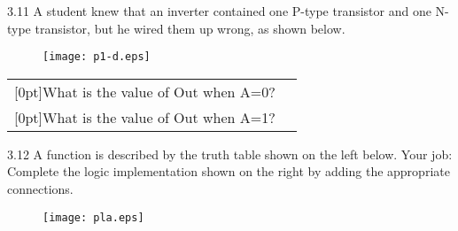 \documentclass{patt}
\begin{document}
\begin{exercises}
  \begin{figure}[H]
  \end{figure}

\item[3.11] A student knew that an inverter contained one P-type transistor
and one N-type transistor, but he wired them up wrong, as shown below. 

\begin{figure}[h]
\centering
\texttt{[image: p1-d.eps]}
\end{figure}

\begin{center}
\begin{tabular}{ll}
     
     \raisebox{1.8ex}[0pt]{What is the value of Out when A=0?} &
\setlength{\unitlength}{1in}

 \\
     \raisebox{1.8ex}[0pt]{What is the value of Out when A=1?} & 
\setlength{\unitlength}{1in}

\\
\end{tabular}

\end{center}

\pagebreak

\item[3.12] A function is described by the truth table shown on the
left below.  Your job: Complete the logic implementation shown on the right
by adding the appropriate connections. 


%

\hspace{2.0in}
\begin{figure}[h]
\centering
\texttt{[image: pla.eps]}
\end{figure}


\end{exercises}
\end{document}
